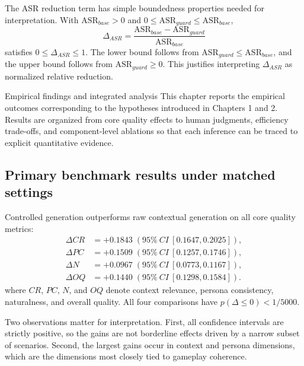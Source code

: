 ﻿\documentclass[a4paper,12pt]{article}
\makeatletter
\let\origsection\section
\renewcommand{\section}{%
  \@ifstar{\origsection*}{%
    \ifnum\value{section}>0
      \clearpage
      \thispagestyle{empty}\null\clearpage
    \else
      \clearpage
    \fi
    \origsection}%
}
\newcommand{\BootstrapSamples}{5000}
\makeatother
\begin{document}
The ASR reduction term has simple boundedness properties needed for interpretation. With \(\mathrm{ASR}_{base}>0\) and \(0\le \mathrm{ASR}_{guard}\le \mathrm{ASR}_{base}\),
\begin{equation}
\Delta_{ASR}=\frac{\mathrm{ASR}_{base}-\mathrm{ASR}_{guard}}{\mathrm{ASR}_{base}}
\end{equation}
satisfies \(0\le\Delta_{ASR}\le1\). The lower bound follows from \(\mathrm{ASR}_{guard}\le\mathrm{ASR}_{base}\), and the upper bound follows from \(\mathrm{ASR}_{guard}\ge0\). This justifies interpreting \(\Delta_{ASR}\) as normalized relative reduction.

\section{Empirical findings and integrated analysis}
This chapter reports the empirical outcomes corresponding to the hypotheses introduced in Chapters 1 and 2. Results are organized from core quality effects to human judgments, efficiency trade-offs, and component-level ablations so that each inference can be traced to explicit quantitative evidence.
\subsection{Primary benchmark results under matched settings}

Controlled generation outperforms raw contextual generation on all core quality metrics:
\begin{equation*}
\begin{aligned}
\Delta CR &= +0.1843\; (95\%\ CI\ [0.1647,0.2025]),\\
\Delta PC &= +0.1509\; (95\%\ CI\ [0.1257,0.1746]),\\
\Delta N  &= +0.0967\; (95\%\ CI\ [0.0773,0.1167]),\\
\Delta OQ &= +0.1440\; (95\%\ CI\ [0.1298,0.1584]).
\end{aligned}
\end{equation*}
where \(CR\), \(PC\), \(N\), and \(OQ\) denote context relevance, persona consistency, naturalness, and overall quality.
All four comparisons have \(p(\Delta\le 0)<1/\BootstrapSamples\).

Two observations matter for interpretation. First, all confidence intervals are strictly positive, so the gains are not borderline effects driven by a narrow subset of scenarios. Second, the largest gains occur in context and persona dimensions, which are the dimensions most closely tied to gameplay coherence.
\end{document}
